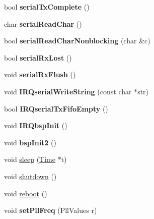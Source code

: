 \begin{DoxyCompactItemize}
\item 
\hypertarget{namespacemiosix_a48a834f9844bcf32bc4939111e5ab04b}{bool {\bfseries serial\-Tx\-Complete} ()}\label{namespacemiosix_a48a834f9844bcf32bc4939111e5ab04b}

\item 
\hypertarget{namespacemiosix_ab61fc17dabe768c75764cba0115d620b}{char {\bfseries serial\-Read\-Char} ()}\label{namespacemiosix_ab61fc17dabe768c75764cba0115d620b}

\item 
\hypertarget{namespacemiosix_a52cf36dbc49201cf658e76e73155737e}{bool {\bfseries serial\-Read\-Char\-Nonblocking} (char \&c)}\label{namespacemiosix_a52cf36dbc49201cf658e76e73155737e}

\item 
\hypertarget{namespacemiosix_a51e68d5fd955c9016eb7b6e9fb771bd6}{bool {\bfseries serial\-Rx\-Lost} ()}\label{namespacemiosix_a51e68d5fd955c9016eb7b6e9fb771bd6}

\item 
\hypertarget{namespacemiosix_aa4f7936bec75c3393891640029692d94}{void {\bfseries serial\-Rx\-Flush} ()}\label{namespacemiosix_aa4f7936bec75c3393891640029692d94}

\item 
\hypertarget{namespacemiosix_a193216addbfab75ff72a6a16b3596401}{void {\bfseries I\-R\-Qserial\-Write\-String} (const char $\ast$str)}\label{namespacemiosix_a193216addbfab75ff72a6a16b3596401}

\item 
\hypertarget{namespacemiosix_aacefbb92c2dd367c7dfcbf9fae450cee}{bool {\bfseries I\-R\-Qserial\-Tx\-Fifo\-Empty} ()}\label{namespacemiosix_aacefbb92c2dd367c7dfcbf9fae450cee}

\item 
\hypertarget{group___interfaces_gaeb88457f0a1ad58c9dd7e7bef0783428}{void {\bfseries I\-R\-Qbsp\-Init} ()}\label{group___interfaces_gaeb88457f0a1ad58c9dd7e7bef0783428}

\item 
\hypertarget{group___interfaces_gab7a59706596b512a2349a9539c9520d8}{void {\bfseries bsp\-Init2} ()}\label{group___interfaces_gab7a59706596b512a2349a9539c9520d8}

\item 
void \hyperlink{group___hardware_ga030255d7e5175ed1ab2c4ce48276ef23}{sleep} (\hyperlink{structmiosix_1_1_time}{Time} $\ast$t)
\item 
void \hyperlink{group___interfaces_gae0495cbfc806a0db0cdf2ff023945516}{shutdown} ()
\item 
void \hyperlink{group___interfaces_ga6f70fdbc3b5d6afa41b5dbc5272cc6a0}{reboot} ()
\item 
\hypertarget{group___hardware_ga754a5465a237b59fe4c938804115e501}{void {\bfseries set\-Pll\-Freq} (Pll\-Values r)}\label{group___hardware_ga754a5465a237b59fe4c938804115e501}


\end{DoxyCompactItemize}

